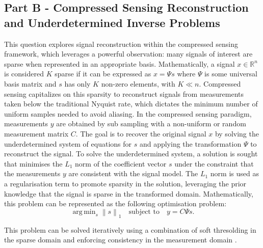 \documentclass[11pt]{article}
\DeclareMathOperator*{\argmin}{arg\,min}  %
\begin{document}
\subsection{Part B - Compressed Sensing Reconstruction and Underdetermined Inverse Problems}
This question explores signal reconstruction within the compressed sensing framework, which leverages a powerful observation: many signals of interest are sparse when represented in an appropriate basis. Mathematically, a signal \( x \in \mathbb{R}^n \) is considered \( K \) sparse if it can be expressed as \( x = \Psi s \) where \( \Psi \) is some universal basis matrix and \( s \) has only \( K \) non-zero elements, with \( K \ll n \). Compressed sensing capitalizes on this sparsity to reconstruct signals from measurements taken below the traditional Nyquist rate, which dictates the minimum number of uniform samples needed to avoid aliasing. In the compressed sensing paradigm, measurements \( y \) are obtained by sub sampling with a non-uniform or random measurement matrix \( C \). The goal is to recover the original signal \( x \) by solving the underdetermined system of equations for \( s \) and applying the transformation \( \Psi \) to reconstruct the signal. To solve the underdetermined system, a solution is sought that minimises the \( L_1 \) norm of the coefficient vector \( s \) under the constraint that the measurements \( y \) are consistent with the signal model. The \( L_1 \) norm is used as a regularisation term to promote sparsity in the solution, leveraging the prior knowledge that the signal is sparse in the transformed domain. Mathematically, this problem can be represented as the following optimisation problem:
\[
\argmin_{s} \left\| s \right\|_1 \quad \text{subject to} \quad y = C \Psi s.
\]

This problem can be solved iteratively using a combination of soft thresolding in the sparse domain and enforcing consistency in the measurement domain \cite{doi:10.1137/080716542}. 
\end{document}
